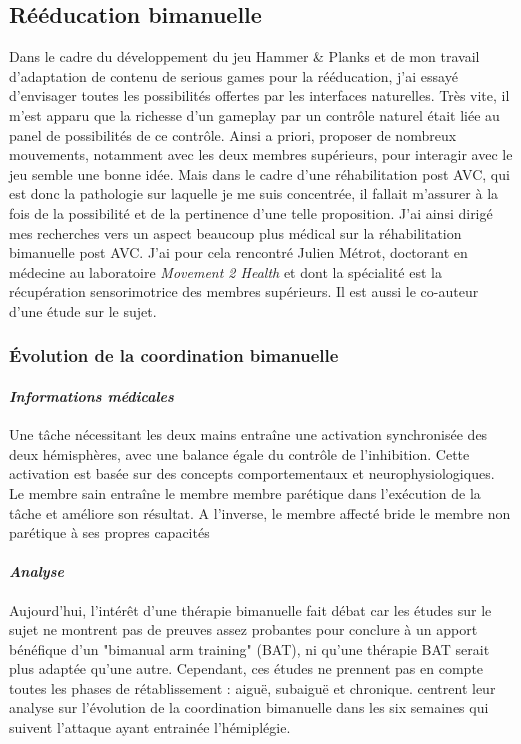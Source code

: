 	
	\subsection{Rééducation bimanuelle} \label{bilateral}
	Dans le cadre du développement du jeu Hammer \& Planks et de mon travail d'adaptation de contenu de serious games pour la rééducation, j'ai essayé d'envisager toutes les possibilités offertes par les interfaces naturelles. Très vite, il m'est apparu que la richesse d'un gameplay par un contrôle naturel était liée au panel de possibilités de ce contrôle. Ainsi a priori, proposer de nombreux mouvements, notamment avec les deux membres supérieurs, pour interagir avec le jeu semble une bonne idée. Mais dans le cadre d'une réhabilitation post AVC, qui est donc la pathologie sur laquelle je me suis concentrée, il fallait m'assurer à la fois de la possibilité et de la pertinence d'une telle proposition. J'ai ainsi dirigé mes recherches vers un aspect beaucoup plus médical sur la réhabilitation bimanuelle post AVC. J'ai pour cela rencontré Julien Métrot, doctorant en médecine au laboratoire \emph{Movement 2 Health} et dont la spécialité est la récupération sensorimotrice des membres supérieurs. Il est aussi le co-auteur d'une étude sur le sujet.
	
		\subsubsection*{Évolution de la coordination bimanuelle}
		
		\paragraph{\emph{Informations médicales}\\}
Une tâche nécessitant les deux mains entraîne une activation synchronisée des deux
hémisphères, avec une balance égale du contrôle de l'inhibition. Cette activation est basée sur des concepts comportementaux et neurophysiologiques.\\
Le membre sain entraîne le membre membre parétique dans l'exécution de la tâche et améliore son
résultat. A l'inverse, le membre affecté bride le membre non parétique à ses propres capacités		
		\paragraph{\emph{Analyse}\\}
Aujourd'hui, l'intérêt d'une thérapie bimanuelle fait débat car les études sur le sujet ne montrent pas de preuves assez probantes pour conclure à un apport bénéfique d'un "bimanual arm training" (BAT), ni qu'une thérapie BAT serait plus adaptée qu'une autre. Cependant, ces études ne prennent pas en compte toutes les phases de rétablissement : aiguë, subaiguë et chronique.\newline
[Metrot et al, 2013]\cite{Metr13} centrent leur analyse sur l'évolution de la coordination bimanuelle dans les six semaines qui suivent l'attaque ayant entrainée l'hémiplégie.

